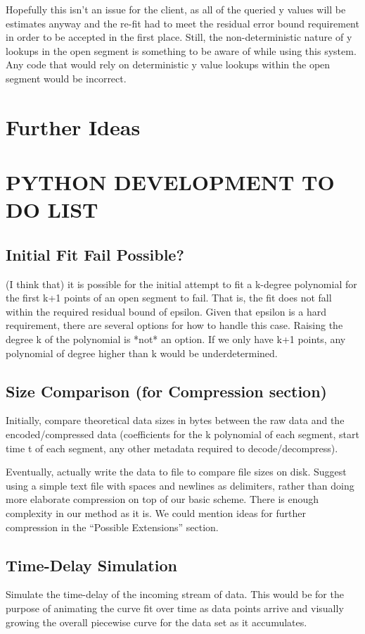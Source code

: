 \documentclass{article}
\begin{document}
Hopefully this isn’t an issue for the client, as all of the queried y values will be estimates anyway and the re-fit had to meet the residual error bound requirement in order to be accepted in the first place. Still, the non-deterministic nature of y lookups in the open segment is something to be aware of while using this system. Any code that would rely on deterministic y value lookups within the open segment would be incorrect.


\section{Further Ideas}


\section{PYTHON DEVELOPMENT TO DO LIST}
\subsection{Initial Fit Fail Possible?}
(I think that) it is possible for the initial attempt to fit a k-degree polynomial for the first k+1 points of an open segment to fail. That is, the fit does not fall within the required residual bound of epsilon. Given that epsilon is a hard requirement, there are several options for how to handle this case. Raising the degree k of the polynomial is *not* an option. If we only have k+1 points, any polynomial of degree higher than k would be underdetermined.

\subsection{Size Comparison (for Compression section)}
Initially, compare theoretical data sizes in bytes between the raw data and the encoded/compressed data (coefficients for the k polynomial of each segment, start time t of each segment, any other metadata required to decode/decompress).

Eventually, actually write the data to file to compare file sizes on disk. Suggest using a simple text file with spaces and newlines as delimiters, rather than doing more elaborate compression on top of our basic scheme. There is enough complexity in our method as it is.
We could mention ideas for further compression in the “Possible Extensions” section.

\subsection{Time-Delay Simulation}
Simulate the time-delay of the incoming stream of data. This would be for the purpose of animating the curve fit over time as data points arrive and visually growing the overall piecewise curve for the data set as it accumulates.
\end{document}
